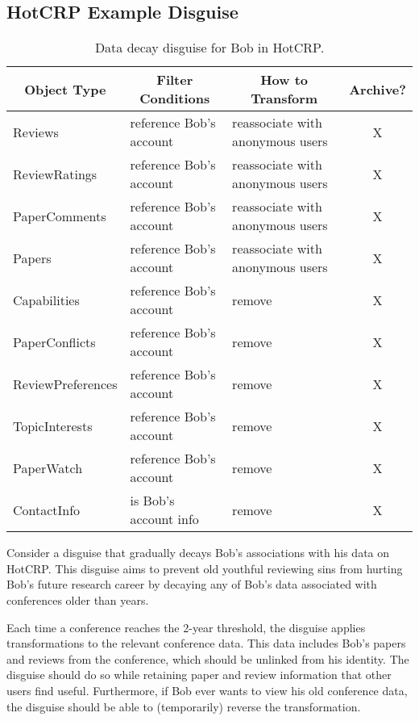 




\iffalse
\subsection{HotCRP Example Disguise}
\begin{table*}[t!]
\begin{tabular}{@{}l|l|l|c@{}}
    \multicolumn{1}{c}{\textbf{Object Type}} & 
    \multicolumn{1}{c}{\textbf{Filter Conditions}} &
    \multicolumn{1}{c}{\textbf{How to Transform}}  &
    \multicolumn{1}{c}{\textbf{Archive?}} \\ 
    \hline
    Reviews & reference Bob's account & reassociate with anonymous users & X\\
    ReviewRatings & reference Bob's account & reassociate with anonymous users & X \\
    PaperComments & reference Bob's account & reassociate with anonymous users & X \\
    Papers 
        & reference Bob's account %
        & reassociate with anonymous users & X\\
    Capabilities & reference Bob's account & remove & X \\
    PaperConflicts & reference Bob's account & remove & X \\
    ReviewPreferences & reference Bob's account & remove &  X \\
    TopicInterests & reference Bob's account & remove &  X \\
    PaperWatch & reference Bob's account & remove & X \\
    ContactInfo & is Bob's account info & remove & X \\
\end{tabular}

    \caption{Data decay disguise for Bob in HotCRP.}
    \label{tab:hotcrp}
\end{table*}

Consider a disguise that gradually decays Bob's associations with his data on HotCRP. This disguise
aims to prevent old youthful reviewing sins from hurting Bob's future research career by 
decaying any of Bob's data associated with conferences older than  years.

Each time a conference reaches the 2-year threshold, the disguise applies transformations to the
relevant conference data. This data includes Bob's papers and reviews from the conference, which
should be unlinked from his identity. 
%
The disguise should do so while retaining paper and review information that other users find useful.
%
Furthermore, if Bob ever wants to view his old conference data, the disguise should be able to
(temporarily) reverse the transformation. 


